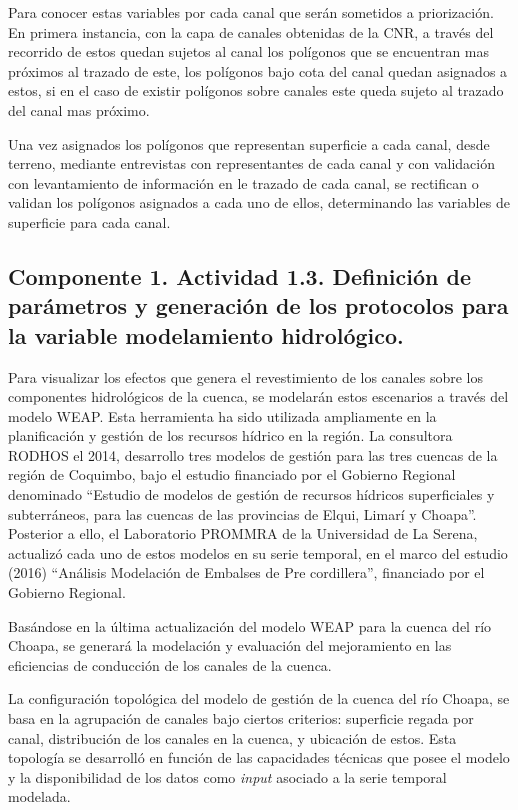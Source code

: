 \documentclass[]{article}
\begin{document}
Para conocer estas variables por cada canal que serán sometidos a priorización. En primera instancia, con la capa de canales obtenidas de la CNR, a través del recorrido de estos quedan sujetos al canal los polígonos que se encuentran mas próximos al trazado de este, los polígonos bajo cota del canal quedan asignados a estos, si en el caso de existir polígonos sobre canales este queda sujeto al trazado del canal mas próximo.

Una vez asignados los polígonos que representan superficie a cada canal, desde terreno, mediante entrevistas con representantes de cada canal y con validación con levantamiento de información en le trazado de cada canal, se rectifican o validan los polígonos asignados a cada uno de ellos, determinando las variables de superficie para cada canal.

\subsection{Componente 1. Actividad 1.3. Definición de parámetros y generación de los protocolos para la variable modelamiento hidrológico.}

Para visualizar los efectos que genera el revestimiento de los canales sobre los componentes hidrológicos de la cuenca, se modelarán estos escenarios a través del modelo WEAP. Esta herramienta ha sido utilizada ampliamente en la planificación y gestión de los recursos hídrico en la región. La consultora RODHOS el 2014, desarrollo tres modelos de gestión para las tres cuencas de la región de Coquimbo, bajo el estudio financiado por el Gobierno Regional denominado “Estudio de modelos de gestión de recursos hídricos superficiales y subterráneos, para las cuencas de las provincias de Elqui, Limarí y Choapa”. Posterior a ello, el Laboratorio PROMMRA de la Universidad de La Serena, actualizó cada uno de estos modelos en su serie temporal, en el marco del estudio (2016) “Análisis Modelación de Embalses de Pre cordillera”, financiado por el Gobierno Regional.

Basándose en la última actualización del modelo WEAP para la cuenca del río Choapa, se generará la modelación y evaluación del mejoramiento en las eficiencias de conducción de los canales de la cuenca.  

La configuración topológica del modelo de gestión de la cuenca del río Choapa, se basa en la agrupación de canales bajo ciertos criterios: superficie regada por canal, distribución de los canales en la cuenca, y ubicación de estos. Esta topología se desarrolló en función de las capacidades técnicas que posee el modelo y la disponibilidad de los datos como \textit{input} asociado a la serie temporal modelada. 
 
\end{document}
